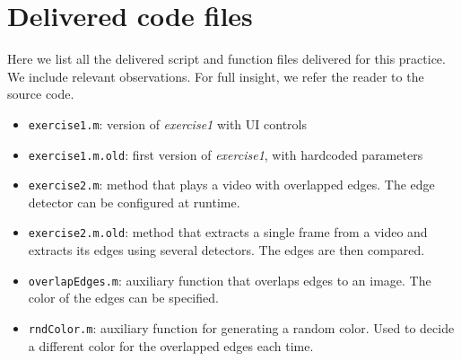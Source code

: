 \section{Delivered code files}

Here we list all the delivered script and function files delivered for this practice.
We include relevant observations. For full insight, we refer the reader to the
source code.

\begin{itemize}
	\item \texttt{exercise1.m}: version of \emph{exercise1} with UI controls
	\item \texttt{exercise1.m.old}: first version of \emph{exercise1}, with hardcoded parameters
	\item \texttt{exercise2.m}: method that plays a video with overlapped edges. The edge detector
	can be configured at runtime.
	\item \texttt{exercise2.m.old}: method that extracts a single frame from a video and extracts its
	edges using several detectors. The edges are then compared.
	\item \texttt{overlapEdges.m}: auxiliary function that overlaps edges to an image. The color of the
	edges can be specified.
	\item \texttt{rndColor.m}: auxiliary function for generating a random color. Used to decide a
	different color for the overlapped edges each time.
\end{itemize}
